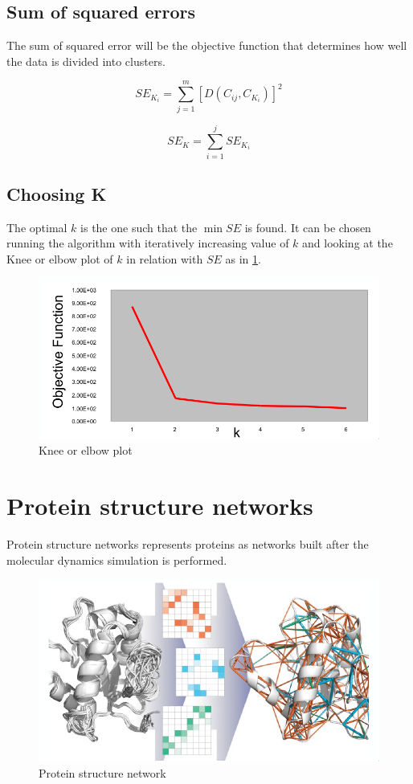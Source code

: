 	\subsection{Sum of squared errors}
	The sum of squared error will be the objective function that determines how well the data is divided into clusters.

	$$SE_{K_i} = \sum\limits_{j=1}^m[D(C_{ij}, C_{K_i})]^2$$

	$$SE_K = \sum\limits_{i=1}^jSE_{K_i}$$

	\subsection{Choosing K}
	The optimal $k$ is the one such that the $\min SE$ is found.
	It can be chosen running the algorithm with iteratively increasing value of $k$ and looking at the Knee or elbow plot of $k$ in relation with $SE$ as in \ref{fig:elbow}.

	\begin{figure}[H]
		\includegraphics[width=\textwidth]{elbow}
		\caption{Knee or elbow plot}
		\label{fig:elbow}
	\end{figure}

\section{Protein structure networks}
Protein structure networks represents proteins as networks built after the molecular dynamics simulation is performed.

\begin{figure}[H]
	\includegraphics[width=\textwidth]{psn}
	\caption{Protein structure network}
	\label{fig:psn}
\end{figure}

